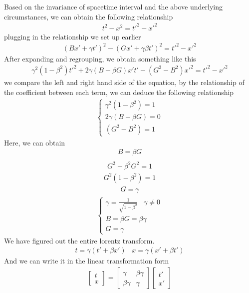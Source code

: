 \documentclass[11pt,letterpaper]{book}
\begin{document}
Based on the invariance of spacetime interval and the above underlying circumstances, we can obtain the following relationship
\begin{align}
t^2 - x^2 = t'^2 - x'^2
\end{align}
plugging in the relationship we set up earlier
\begin{align}
(Bx'+\gamma t')^2 - (Gx' + \gamma \beta t')^2 = t'^2 - x'^2
\end{align}
After expanding and regrouping, we obtain something like this
\begin{align}
\gamma^2(1-\beta^2)t'^2 +2\gamma(B-\beta G)x't' - (G^2 - B^2)x'^2 = t'^2 - x'^2
\end{align}
we compare the left and right hand side of the equation, by the relationship of the coefficient between each term, we can deduce the following relationship
\begin{align}
\begin{cases}
    \gamma^2(1-\beta^2)=1\\
    2\gamma(B-\beta G)=0\\
    (G^2-B^2)=1
\end{cases}
\end{align}
Here, we can obtain
\begin{align}
B=\beta G\\
\end{align}
\begin{align}
G^2 - \beta ^2 G^2 = 1
\end{align}
\begin{align}
G^2(1-\beta ^2 ) = 1
\end{align}
\begin{align}
G = \gamma
\end{align}
\begin{align}
\begin{cases}
    \gamma = \frac{1}{\sqrt{1-\beta^2}} \;\;\; \gamma \neq 0\\
    B=\beta G = \beta \gamma \\ 
    G = \gamma
\end{cases}
\end{align}
We have figured out the entire lorentz transform.
\begin{align}
t = \gamma (t'+\beta x') \;\;\;
x = \gamma (x'+\beta t')
\end{align}
And we can write it in the linear transformation form
\begin{align}
\begin{bmatrix}
    t \\ x
\end{bmatrix}
=
\begin{bmatrix}
    \gamma      &   \beta\gamma   \\
    \beta\gamma &   \gamma
\end{bmatrix}
\begin{bmatrix}
    t'\\ x'
\end{bmatrix}
\end{align}
\end{document}
